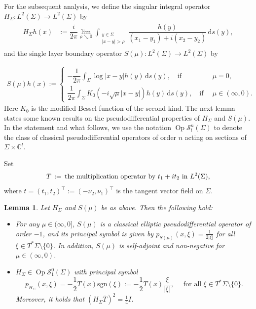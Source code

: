 \documentclass[11pt,a4paper,reqno,oneside]{amsproc}
\DeclareMathOperator{\Op}{Op}
\newcommand{\cS}{\mathcal{S}}
\def \cc {{\mathbb C}}
\numberwithin{equation}{section}
\def \cc {{\mathbb{C}}}
\newtheorem{lemma}[definition]{Lemma}
\begin{document}
For the subsequent analysis, we define the singular integral operator $H_\Sigma :\mathit{L}^2(\Sigma)  \longrightarrow \mathit{L}^2(\Sigma)$ by
\begin{align}\label{Cauchy2}
		\begin{split}
			H_{\Sigma}h(x)&:= \dfrac{i}{2\pi}\lim\limits_{\rho\searrow 0}\int_{\substack{y\in\Sigma\\ |x-y|>\rho}}\dfrac{h(y)}{(x_1-y_1) +i(x_2-y_2)}\,\mathrm{d}s(y),
		\end{split}
\end{align}
and the single layer boundary operator  $S(\mu) :\mathit{L}^2(\Sigma)  \longrightarrow \mathit{L}^2(\Sigma)$ by

\begin{align}\label{SL}
S(\mu)h(x):= 	\begin{cases}
		-\dfrac{1}{2\pi}\int_{\Sigma}\log|x-y|h(y)\,\mathrm{d}s(y), \quad \text{if } &\, \mu=0,\\
		\dfrac{1}{2\pi}\int_{\Sigma}K_0(-i\sqrt{\mu}|x-y|)h(y)\,\mathrm{d}s(y), \quad \text{if }& \, \mu\in(\infty,0).
	\end{cases}
\end{align}
Here $K_0$ is the modified Bessel function of the second kind. The next lemma states some known results on the pseudodifferential properties of $H_\Sigma$ and $S(\mu)$.  In the statement and what follows, we use the notation $\Op \cS^n_l(\Sigma)$ to denote the class of classical pseudodifferential operators of order $n$ acting on sections of $\Sigma\times \cc^l$.

Set 
\begin{align}\label{Def T}
T\,:=\, \text{the multiplication operator by $ t_1+ i t_2$ in $L^2(\Sigma),$}
\end{align}
where $t=(t_1,t_2)^{\top}:=(-\nu_2,\nu_1)^{\top}$ is the tangent vector field on $\Sigma$. 
\begin{lemma}\label{H properties} Let  $H_\Sigma$ and $S(\mu)$ be as above. Then the following hold:
\begin{itemize}
\item[(i)] For any $\mu\in(\infty,0]$, $S(\mu)$ is a  classical elliptic pseudodifferential operator of order $-1$, and its  principal symbol is given by $p_{S(\mu)}(x,\xi)= \frac{1}{2|\xi|}$ for all $\xi\in T^\ast \Sigma\setminus\{0\}$. In addition, $S(\mu)$ is self-adjoint and non-negative for $\mu\in(\infty,0)$.

 \item[(ii)] $H_\Sigma\in \Op \cS^0_1(\Sigma)$  with principal symbol
\[
	p_{H_\Sigma}(x,\xi) = -\frac{1}{2}T(x) \mathrm{sgn}(\xi):= -\frac{1}{2}T(x)\frac{\xi}{|\xi|},\quad \text{ for all } \xi\in T^\ast \Sigma\setminus\{0\}.
\]
	Moreover, it holds that $(H_\Sigma\overline{T})^2=\frac{1}{4} I$.
\end{itemize}

\end{lemma}
\end{document}
